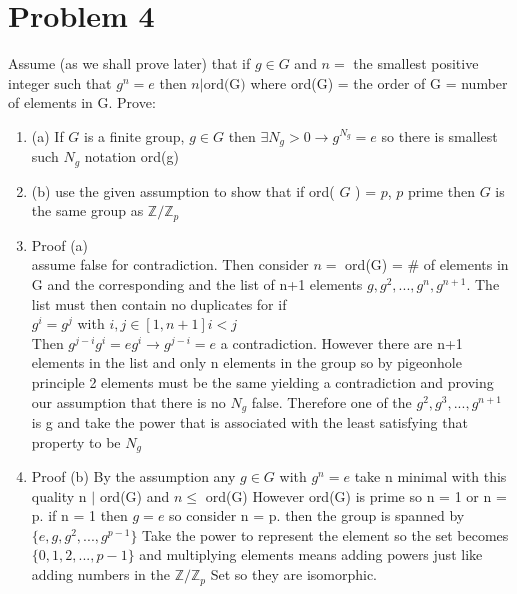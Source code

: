 \documentclass{article}
\begin{document}
    \section{Problem 4}
    Assume (as we shall prove later) that if  $g \in G$ and $n =$ the smallest positive integer
    such that $g^{n} = e$ then $n|\text{ord(G)}$ where ord(G) = the order of G = number of elements in G.
    Prove:
    \begin{enumerate}
        \item (a) If $G$ is a finite group, $g \in G$ then $\exists N_g>0 \rightarrow g^{N_g} = e$ 
            so there is smallest such $N_g$ notation ord(g)
        \item (b) use the given assumption to show that if ord( $G$ ) = $p$, $p$ prime
            then $G$ is the same group as $ \mathbb{Z}/ \mathbb{Z}_p$ 
        \item Proof (a)\\
            assume false for contradiction. Then  consider $n = $ ord(G) = \# of elements in G and the corresponding
            and the list of n+1 elements $g, g^2, ... , g^{n}, g^{n+1}$. The list must then contain
            no duplicates for if \\$g^{i} = g^{j}$ with $ i,j \in [1,n+1] i < j$ \\
        Then $g^{j-i}g^{i} = eg^{i} \rightarrow g^{j-i} = e$ a contradiction. 
            However there are n+1 elements in the list and only n elements in the group
            so by pigeonhole principle 2 elements must be the same yielding a contradiction and proving our assumption
            that there is no $N_g$ false. Therefore one of the $g^{2}, g^{3}, ..., g^{n+1}$ is g and 
            take the power that is associated with the least satisfying that property to be $N_g$
        \item Proof (b)
            By the assumption any $g \in G$ with $g^{n} = e$ take n minimal with this quality  n $|$ ord(G)  and $n \le$ ord(G)
            However ord(G) is prime so n = 1 or n = p. if n = 1 then $g = e$ so consider n = p. then the group is spanned by
            $\{e, g, g^{2}, ..., g^{p-1}\}$ Take the power to represent the element so the set becomes
            $\{0, 1, 2, ..., p-1\}$ and multiplying elements means adding powers just like adding numbers in the  $ \mathbb{Z}/ \mathbb{Z}_p$ 
            Set so they are isomorphic.
    \end{enumerate}
\end{document}
